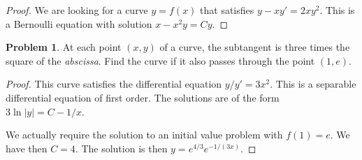 \documentclass{scrartcl}
\theoremstyle{definition}
\newtheorem*{problem*}{Problem}
\begin{document}
\begin{proof}
We are looking for a curve $y=f(x)$ that satisfies $y-xy'=2xy^2$.
This is a Bernoulli equation with solution $x-x^2y=Cy$.
\end{proof}

\begin{problem*}
At each point $(x,y)$ of a curve, the subtangent is three times the
square of the \emph{abscissa}.  Find the curve if it also passes
through the point $(1,e)$. 
\end{problem*}

\begin{center}
\end{center}


\begin{proof}
This curve satisfies the differential equation $y/y'=3x^2$.  This is a
separable differential equation of first order.  The solutions are of
the form $3\ln \lvert y \rvert = C- 1/x$. 

We actually require the solution to an initial value problem with $f(1)=e$.  We
have then $C=4$.  The solution is then $y = e^{4/3}e^{-1/(3x)}$.
\end{proof}
\end{document}
